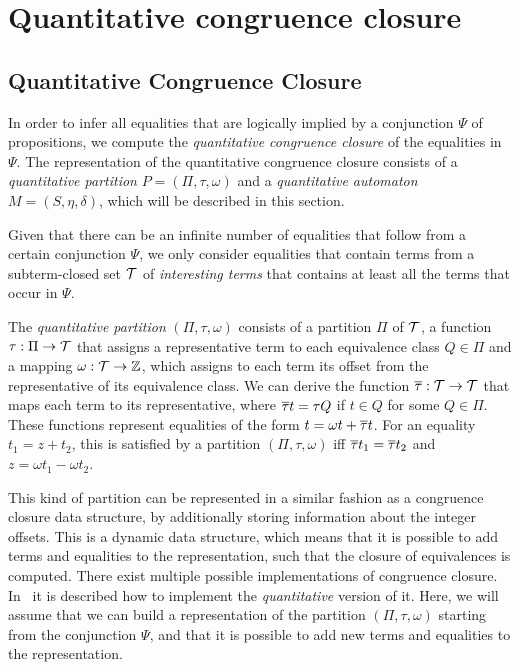 \section{Quantitative congruence closure}

\subsection{Quantitative Congruence Closure}\label{qcc}

In order to infer all equalities that are logically implied by a conjunction $\Psi$ of propositions, we compute the \emph{quantitative congruence closure} of the equalities in $\Psi$.
The representation of the quantitative congruence closure consists of a \emph{quantitative partition} $P = (\Pi,\tau,\omega)$ and a \emph{quantitative automaton} $M = (S, \eta, \delta)$, which will be described in this section.

Given that there can be an infinite number of equalities that follow from a certain conjunction $\Psi$, we only consider equalities that contain terms from a subterm-closed set $\mathcal{T}$ of \emph{interesting terms} that contains at least all the terms that occur in $\Psi$.

The \emph{quantitative partition} $(\Pi, \tau, \omega)$ consists of a partition $\Pi$ of $\mathcal{T}$, a function $\tau : \Pi \rightarrow \mathcal{T}$ that assigns a representative term to each equivalence class $Q \in \Pi$ and a mapping $\omega : \mathcal{T} \rightarrow \mathbb{Z}$, which assigns to each term its offset from the representative of its equivalence class.
We can derive the function $\overline{\tau} : \mathcal{T} \rightarrow \mathcal{T}$ that maps each term to its representative, where $\overline{\tau} t = \tau Q$ if $t \in Q$ for some $Q \in \Pi$.
These functions represent equalities of the form $t = \omega t + \overline{\tau} t$.
For an equality $t_1 = z + t_2$, this is satisfied by a partition $(\Pi, \tau, \omega)$ iff $\overline{\tau} t_1 = \overline{\tau} t_2$ and $z = \omega t_1 - \omega t_2$.

This kind of partition can be represented in a similar fashion as a congruence closure data structure\cite{abstract-cc}, by additionally storing information about the integer offsets.
This is a dynamic data structure, which means that it is possible to add terms and equalities to the representation, such that the closure of equivalences is computed.
There exist multiple possible implementations of congruence closure\cite{cc-nelson, cc-shostak, cc-tarjan}.
In~\cite{2pointer} it is described how to implement the \emph{quantitative} version of it.
Here, we will assume that we can build a representation of the partition $(\Pi, \tau, \omega)$ starting from the conjunction $\Psi$, and that it is possible to add new terms and equalities to the representation.

